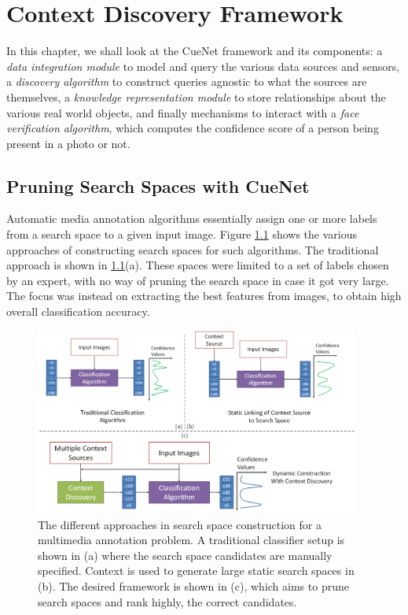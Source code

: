\chapter{Context Discovery Framework}

In this chapter, we shall look at the CueNet framework and its components: a \textit{data integration module} to model and query the various data sources and sensors, a \textit{discovery algorithm} to construct queries agnostic to what the sources are themselves, a \textit{knowledge representation module} to store relationships about the various real world objects, and finally mechanisms to interact with a \textit{face verification algorithm}, which computes the confidence score of a person being present in a photo or not.

\section{Pruning Search Spaces with CueNet}

Automatic media annotation algorithms essentially assign one or more labels from a search space to a given input image. Figure \ref{fig:with-without-cuenet} shows the various approaches of constructing search spaces for such algorithms. The traditional approach is shown in \ref{fig:with-without-cuenet}(a). These spaces were limited to a set of labels chosen by an expert, with no way of pruning the search space in case it got very large. 
The focus was instead on extracting the best features from images, to obtain high overall classification accuracy\cite{turk1991eigenfaces}.

\begin{figure}[t]
\centering
\includegraphics[width=0.95\textwidth]{media/with-without-cuenet-2.png}
\caption{The different approaches in search space construction for a multimedia annotation problem. A traditional classifier setup is shown in (a) where the search space candidates are manually specified. Context is used to generate large static search spaces in (b). The desired framework is shown in (c), which aims to prune search spaces and rank highly, the correct candidates.}
\label{fig:with-without-cuenet}
\end{figure}

